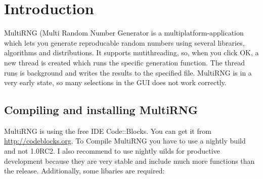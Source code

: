\documentclass{scrartcl}
\begin{document}
\tableofcontents
\section{Introduction}
MultiRNG (Multi Random Number Generator is a multiplatform-application which lets you generate reproducable random numbers using several libraries, algorithms and distributions.\newline
It supports mutithreading, so, when you click OK, a new thread is created which runs the specific generation function. The thread runs is background and writes the results to the specified file.\newline
MultiRNG is in a very early state, so many selections in the GUI does not work correctly.
\subsection{Compiling and installing MultiRNG}
MultiRNG is using the free IDE Code::Blocks. You can get it from \url{http://codeblocks.org}. To Compile MultiRNG you have to use a nightly build and not 1.0RC2. I also recommend to use nightly uilds for productive development because they are very stable and include much more functions than the release.\newline
Additionally, some libaries are required:
\end{document}
